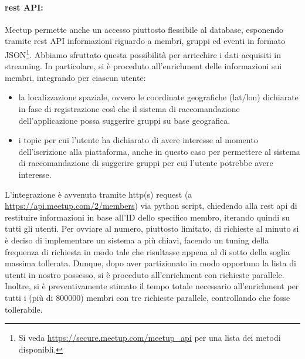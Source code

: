 \documentclass[fleqn,10pt]{SelfArx} %
\begin{document}
{\paragraph{rest API:} Meetup permette anche un accesso piuttosto flessibile al database, esponendo tramite rest API informazioni riguardo a membri, gruppi ed eventi in formato JSON\footnote{Si veda \url{https://secure.meetup.com/meetup_api} per una lista dei metodi disponibli.}.
Abbiamo sfruttato questa possibilità per arricchire i dati acquisiti in streaming. 
In particolare, si è proceduto all'enrichment delle informazioni sui membri, integrando per ciascun utente:
\begin{itemize}[noitemsep]
\item la localizzazione spaziale, ovvero le coordinate geografiche (lat/lon) dichiarate in fase di registrazione così che il sistema di raccomandazione dell'applicazione possa suggerire gruppi su base geografica.
\item i topic per cui l'utente ha dichiarato di avere interesse al momento dell'iscrizione alla piattaforma, anche in questo caso per permettere al sistema di raccomandazione di suggerire gruppi per cui l'utente potrebbe avere interesse.
\end{itemize}
L'integrazione è avvenuta tramite http(s) request (a \url{https://api.meetup.com/2/members}) via python script, chiedendo alla rest api di restituire informazioni in base all'ID dello specifico membro, iterando quindi su tutti gli utenti.
Per ovviare al numero, piuttosto limitato, di richieste al minuto si è deciso di implementare un sistema a più chiavi, facendo un tuning della frequenza di richiesta in modo tale che risultasse appena al di sotto della soglia massima tollerata.
Dunque, dopo aver partizionato in modo opportuno la lista di utenti in nostro possesso, si è proceduto all'enrichment con richieste parallele. 
Inoltre, si è preventivamente stimato il tempo totale necessario all'enrichment per tutti i (più di $800000$) membri con tre richieste parallele, controllando che fosse tollerabile.
}
\end{document}
